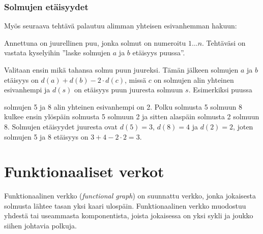 \subsubsection{Solmujen etäisyydet}

Myös seuraava tehtävä palautuu alimman yhteisen
esivanhemman hakuun:
\begin{task}
Annettuna on juurellinen puu, jonka solmut on numeroitu $1 \ldots n$.
Tehtäväsi on vastata kyselyihin
''laske solmujen $a$ ja $b$ etäisyys puussa''.
\end{task}

Valitaan ensin mikä tahansa
solmu puun juureksi.
Tämän jälkeen solmujen $a$ ja $b$
etäisyys on $d(a)+d(b)-2 \cdot d(c)$,
missä $c$ on solmujen alin yhteinen esivanhempi
ja $d(s)$ on etäisyys puun juuresta solmuun $s$.
Esimerkiksi puussa

\begin{center}
\end{center}

solmujen 5 ja 8 alin yhteinen esivanhempi on 2.
Polku solmusta 5 solmuun 8
kulkee ensin ylöspäin solmusta 5
solmuun 2 ja sitten alaspäin
solmusta 2 solmuun 8.
Solmujen etäisyydet juuresta ovat $d(5)=3$,
$d(8)=4$ ja $d(2)=2$,
joten solmujen 5 ja 8 etäisyys
on $3+4-2\cdot2=3$.

\section{Funktionaaliset verkot}

Funktionaalinen verkko (\textit{functional graph})
on suunnattu verkko, jonka jokaisesta solmusta lähtee
tasan yksi kaari ulospäin.
Funktionaalinen verkko muodostuu yhdestä tai
useammasta komponentista, joista jokaisessa
on yksi sykli ja joukko siihen johtavia polkuja.

